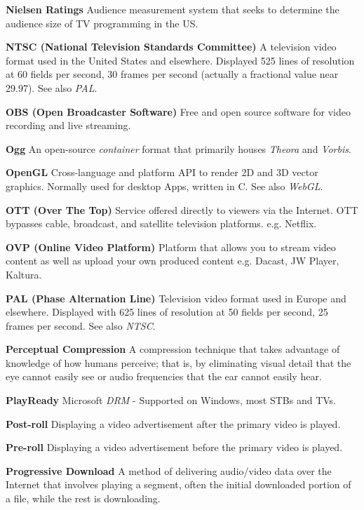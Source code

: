 \medskip
\textbf{Nielsen Ratings}
Audience measurement system that seeks to determine the audience size of TV programming in the US.

\smallskip
\textbf{NTSC (National Television Standards Committee)}
A television video format used in the United States and elsewhere. Displayed 525 lines of resolution at 60 fields per second, 30 frames per second (actually a fractional value near 29.97). See also \textit{PAL}.

\smallskip
\textbf{OBS (Open Broadcaster Software)}
Free and open source software for video recording and live streaming.

\smallskip
\textbf{Ogg}
An open-source \textit{container} format that primarily houses \textit{Theora} and \textit{Vorbis}.

\smallskip
\textbf{OpenGL}
Cross-language and platform API to render 2D and 3D vector graphics.  Normally used for desktop Apps, written in C. See also \textit{WebGL}.

\smallskip
\textbf{OTT (Over The Top)}
Service offered directly to viewers via the Internet. OTT bypasses cable, broadcast, and satellite television platforms. e.g. Netflix.

\smallskip
\textbf{OVP (Online Video Platform)}
Platform that allows you to stream video content as well as upload your own produced content e.g. Dacast, JW Player, Kaltura.

\smallskip
\textbf{PAL (Phase Alternation Line)}
Television video format used in Europe and elsewhere. Displayed with 625 lines of resolution at 50 fields per second, 25 frames per second. See also \textit{NTSC}.

\smallskip
\textbf{Perceptual Compression}
A compression technique that takes advantage of knowledge of how humans perceive; that is, by eliminating visual detail that the eye cannot easily see or audio frequencies that the ear cannot easily hear.

\smallskip
\textbf{PlayReady}
Microsoft \textit{DRM} - Supported on Windows, most STBs and TVs.

\smallskip
\textbf{Post-roll}
Displaying a video advertisement after the primary video is played.

\smallskip
\textbf{Pre-roll}
Displaying a video advertisement before the primary video is played.

\smallskip
\textbf{Progressive Download}
A method of delivering audio/video data over the Internet that involves playing a segment, often the initial downloaded portion of a file, while the rest is downloading.

